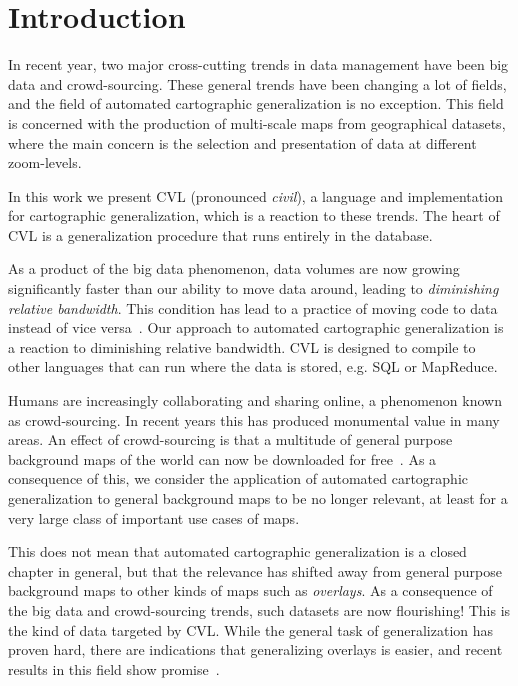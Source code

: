 \section{Introduction}
In recent year, two major cross-cutting trends in data management have been  big data and crowd-sourcing. These general trends have been changing a lot of fields, and the field of automated cartographic generalization is no exception. This field is concerned with the production of multi-scale maps from geographical datasets, where the main concern is the selection and presentation of data at different zoom-levels.

In this work we present CVL (pronounced \emph{civil}), a language and implementation for cartographic generalization, which is a reaction to these trends. The heart of CVL is a generalization procedure that runs entirely in the database.

As a product of the big data phenomenon, data volumes are now growing significantly faster than our ability to move data around, leading to \emph{diminishing relative bandwidth}. This condition has lead to a practice of moving code to data~\cite{mapreduce} instead of vice versa~\cite{fusiontables}. Our approach to automated cartographic generalization is a reaction to diminishing relative bandwidth. CVL is designed to compile to other languages that can run where the data is stored, e.g. SQL or MapReduce.

Humans are increasingly collaborating and sharing online, a phenomenon known as crowd-sourcing. In recent years this has produced monumental value in many areas. An effect of crowd-sourcing is that a multitude of general purpose background maps of the world can now be downloaded for free~\cite{openstreetmap,googlemaps,bingmaps}. As a consequence of this, we consider the application of automated cartographic generalization to general background maps to be no longer relevant, at least for a very large class of important use cases of maps.

This does not mean that automated cartographic generalization is a closed chapter in general, but that the relevance has shifted away from general purpose background maps to other kinds of maps such as \emph{overlays}. As a consequence of the big data and crowd-sourcing trends, such datasets are now flourishing! This is the kind of data targeted by CVL. While the general task of generalization has proven hard, there are indications that generalizing overlays is easier, and recent results in this field show promise~\cite{fusiontables,thatotherpaper}. 

